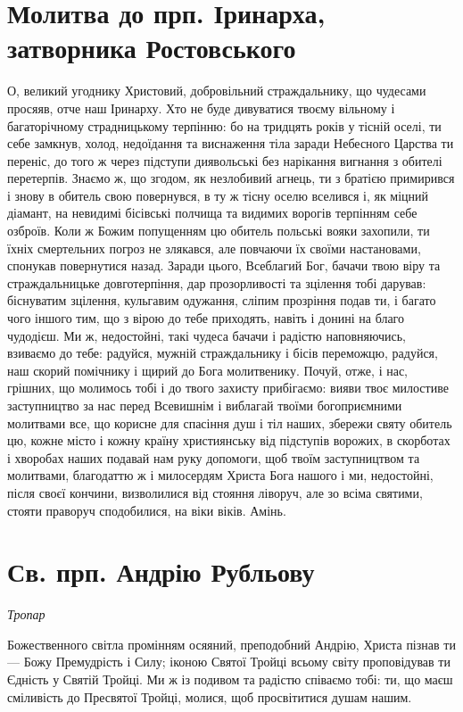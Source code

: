 \documentclass[chapters.tex]{subfiles}
\begin{document}
\section{Молитва до прп. Іринарха, затворника Ростовського}
О, великий угоднику Христовий, добровільний страждальнику, що чудесами просяяв, отче наш Іринарху. Хто не буде дивуватися твоєму вільному і багаторічному страдницькому терпінню: бо на тридцять років у тісній оселі, ти себе замкнув, холод, недоїдання та виснаження тіла заради Небесного Царства ти переніс, до того ж через підступи диявольські без нарікання вигнання з обителі перетерпів. Знаємо ж, що згодом, як незлобивий агнець, ти з братією примирився і знову в обитель свою повернувся, в ту ж тісну оселю вселився і, як міцний діамант, на невидимі бісівські полчища та видимих ворогів терпінням себе озброїв. Коли ж Божим попущенням цю обитель польські вояки захопили, ти їхніх смертельних погроз не злякався, але повчаючи їх своїми настановами, спонукав повернутися назад. Заради цього, Всеблагий Бог, бачачи твою віру та страждальницьке довготерпіння, дар прозорливості та зцілення тобі дарував: біснуватим зцілення, кульгавим одужання, сліпим прозріння подав ти, і багато чого іншого тим, що з вірою до тебе приходять, навіть і донині на благо чудодієш. Ми ж, недостойні, такі чудеса бачачи і радістю наповняючись, взиваємо до тебе: радуйся, мужній страждальнику і бісів переможцю, радуйся, наш скорий помічнику і щирий до Бога молитвенику. Почуй, отже, і нас, грішних, що молимось тобі і до твого захисту прибігаємо: вияви твоє милостиве заступництво за нас перед Всевишнім і виблагай твоїми богоприємними молитвами все, що корисне для спасіння душ і тіл наших, збережи святу обитель цю, кожне місто і  кожну країну християнську від підступів ворожих, в скорботах і хворобах наших подавай нам руку допомоги, щоб твоїм заступництвом та молитвами, благодаттю ж і милосердям Христа Бога нашого і ми, недостойні, після своєї кончини, визволилися від стояння ліворуч, але зо всіма святими, стояти праворуч сподобилися, на віки віків. Амінь.

\section{Св. прп. Андрію Рубльову}
\emph{Тропар}

Божественного світла промінням осяяний, преподобний Андрію, Христа пізнав ти — Божу Премудрість і Силу; іконою Святої Тройці всьому світу проповідував ти Єдність у Святій Тройці. Ми ж із подивом та радістю співаємо тобі: ти, що маєш сміливість до Пресвятої Тройці, молися, щоб просвітитися душам нашим.
\end{document}
